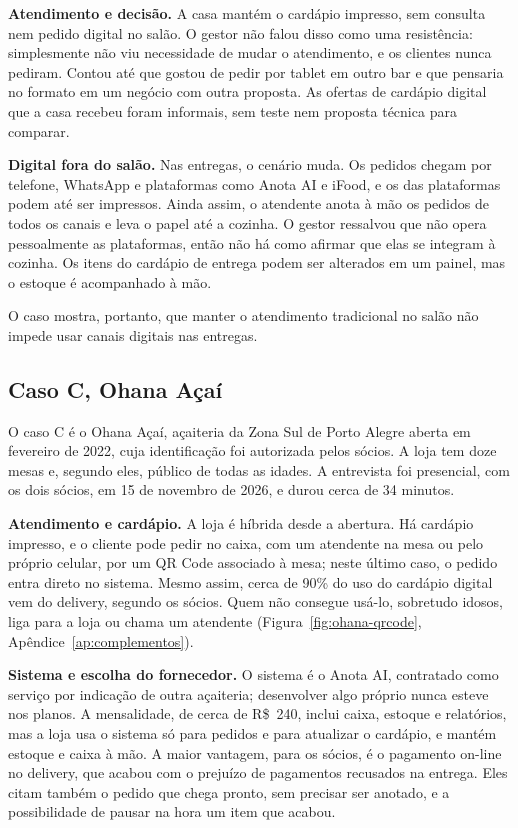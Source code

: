 \textbf{Atendimento e decisão.} A casa mantém o cardápio impresso, sem consulta nem pedido digital no salão. O gestor não falou disso como uma resistência: simplesmente não viu necessidade de mudar o atendimento, e os clientes nunca pediram. Contou até que gostou de pedir por tablet em outro bar e que pensaria no formato em um negócio com outra proposta. As ofertas de cardápio digital que a casa recebeu foram informais, sem teste nem proposta técnica para comparar.

\textbf{Digital fora do salão.} Nas entregas, o cenário muda. Os pedidos chegam por telefone, WhatsApp e plataformas como Anota AI e iFood, e os das plataformas podem até ser impressos. Ainda assim, o atendente anota à mão os pedidos de todos os canais e leva o papel até a cozinha. O gestor ressalvou que não opera pessoalmente as plataformas, então não há como afirmar que elas se integram à cozinha. Os itens do cardápio de entrega podem ser alterados em um painel, mas o estoque é acompanhado à mão.

O caso mostra, portanto, que manter o atendimento tradicional no salão não impede usar canais digitais nas entregas.

\subsection{Caso C, Ohana Açaí}
\label{sec:res-caso-c}

O caso C é o Ohana Açaí, açaiteria da Zona Sul de Porto Alegre aberta em fevereiro de 2022, cuja identificação foi autorizada pelos sócios. A loja tem doze mesas e, segundo eles, público de todas as idades. A entrevista foi presencial, com os dois sócios, em 15 de novembro de 2026, e durou cerca de 34 minutos.

\textbf{Atendimento e cardápio.} A loja é híbrida desde a abertura. Há cardápio impresso, e o cliente pode pedir no caixa, com um atendente na mesa ou pelo próprio celular, por um QR Code associado à mesa; neste último caso, o pedido entra direto no sistema. Mesmo assim, cerca de 90\% do uso do cardápio digital vem do delivery, segundo os sócios. Quem não consegue usá-lo, sobretudo idosos, liga para a loja ou chama um atendente (Figura~\ref{fig:ohana-qrcode}, Apêndice~\ref{ap:complementos}).

\textbf{Sistema e escolha do fornecedor.} O sistema é o Anota AI, contratado como serviço por indicação de outra açaiteria; desenvolver algo próprio nunca esteve nos planos. A mensalidade, de cerca de R\$~240, inclui caixa, estoque e relatórios, mas a loja usa o sistema só para pedidos e para atualizar o cardápio, e mantém estoque e caixa à mão. A maior vantagem, para os sócios, é o pagamento on-line no delivery, que acabou com o prejuízo de pagamentos recusados na entrega. Eles citam também o pedido que chega pronto, sem precisar ser anotado, e a possibilidade de pausar na hora um item que acabou.

